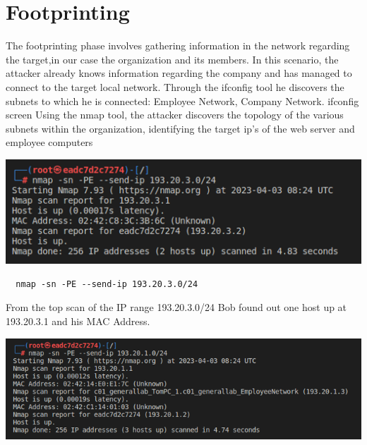 \documentclass[a4paper, 12pt, oneside]{extbook}
\begin{document}

\frontmatter

{
\tableofcontents
}

\mainmatter
\chapter{Footprinting}
The footprinting phase involves gathering information in the network regarding the target,in our case the organization and its members.
\newline In this scenario, the attacker already knows information regarding the company and has managed to connect to the target local network.
\newline Through the ifconfig tool he discovers the subnets to which he is connected: Employee Network, Company Network.
\newline ifconfig screen
\newline Using the nmap tool, the attacker discovers the topology of the various subnets within the organization, identifying the target ip's of the web server and employee computers
\begin{center}
\includegraphics[scale=1]{../Image/footprinting_company_network.png}
\end{center}
\begin{lstlisting}
  nmap -sn -PE --send-ip 193.20.3.0/24
\end{lstlisting}
From the top scan of the IP range 193.20.3.0/24 Bob found out one host up at 193.20.3.1 and his MAC Address.
\begin{center}
\includegraphics[scale=0.76]{../Image/footprinting_employee_network.png}
\end{center}
\newpage
\end{document}
